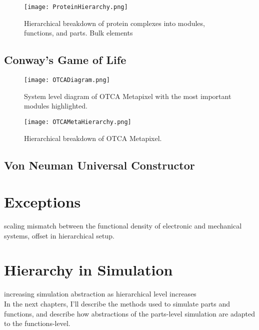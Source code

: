 {\begin{sidewaysfigure}
  \texttt{[image: ProteinHierarchy.png]}
  \caption{Hierarchical breakdown of protein complexes into modules, functions, and parts.  Bulk elements}
  \label{fig:ProteinHierarchy}
\end{sidewaysfigure}

\subsection{Conway's Game of Life}

\begin{figure}
  \texttt{[image: OTCADiagram.png]}
  \caption{System level diagram of OTCA Metapixel with the most important modules highlighted.}
  \label{fig:OTCADiagram}
\end{figure}

\begin{sidewaysfigure}
  \texttt{[image: OTCAMetaHierarchy.png]}
  \caption{Hierarchical breakdown of OTCA Metapixel.}
  \label{fig:OTCAMetaHierarchy}
\end{sidewaysfigure}

\subsection{Von Neuman Universal Constructor}

\section{Exceptions}

scaling mismatch between the functional density of electronic and mechanical systems, offset in hierarchical setup.

\section{Hierarchy in Simulation}

increasing simulation abstraction as hierarchical level increases\\

In the next chapters, I'll describe the methods used to simulate parts and functions, and describe how abstractions of the parts-level simulation are adapted to the functions-level.



}

